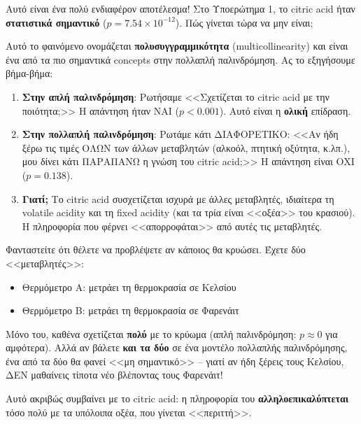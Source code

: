 \documentclass[12pt,a4paper]{article}
\begin{document}
Αυτό είναι ένα πολύ ενδιαφέρον αποτέλεσμα! Στο Υποερώτημα 1, το citric acid ήταν \textbf{στατιστικά σημαντικό} ($p = 7.54 \times 10^{-12}$). Πώς γίνεται τώρα να μην είναι;

\begin{theorybox}
Αυτό το φαινόμενο ονομάζεται \textbf{πολυσυγγραμμικότητα} (multicollinearity) και είναι ένα από τα πιο σημαντικά concepts στην πολλαπλή παλινδρόμηση. Ας το εξηγήσουμε βήμα-βήμα:

\begin{enumerate}
    \item \textbf{Στην απλή παλινδρόμηση}: Ρωτήσαμε <<Σχετίζεται το citric acid με την ποιότητα;>> Η απάντηση ήταν ΝΑΙ ($p < 0.001$). Αυτό είναι η \textbf{ολική} επίδραση.

    \item \textbf{Στην πολλαπλή παλινδρόμηση}: Ρωτάμε κάτι ΔΙΑΦΟΡΕΤΙΚΟ: <<Αν ήδη ξέρω τις τιμές ΟΛΩΝ των άλλων μεταβλητών (αλκοόλ, πτητική οξύτητα, κ.λπ.), μου δίνει κάτι ΠΑΡΑΠΑΝΩ η γνώση του citric acid;>> Η απάντηση είναι ΟΧΙ ($p = 0.138$).

    \item \textbf{Γιατί;} Το citric acid συσχετίζεται ισχυρά με άλλες μεταβλητές, ιδιαίτερα τη volatile acidity και τη fixed acidity (και τα τρία είναι <<οξέα>> του κρασιού). Η πληροφορία που φέρνει <<απορροφάται>> από αυτές τις μεταβλητές.
\end{enumerate}
\end{theorybox}

\begin{examplebox}
Φανταστείτε ότι θέλετε να προβλέψετε αν κάποιος θα κρυώσει. Έχετε δύο <<μεταβλητές>>:
\begin{itemize}
    \item Θερμόμετρο Α: μετράει τη θερμοκρασία σε Κελσίου
    \item Θερμόμετρο Β: μετράει τη θερμοκρασία σε Φαρενάιτ
\end{itemize}

Μόνο του, καθένα σχετίζεται \textbf{πολύ} με το κρύωμα (απλή παλινδρόμηση: $p \approx 0$ για αμφότερα). Αλλά αν βάλετε \textbf{και τα δύο} σε ένα μοντέλο πολλαπλής παλινδρόμησης, ένα από τα δύο θα φανεί <<μη σημαντικό>> -- γιατί αν ήδη ξέρεις τους Κελσίου, ΔΕΝ μαθαίνεις τίποτα νέο βλέποντας τους Φαρενάιτ!

Αυτό ακριβώς συμβαίνει με το citric acid: η πληροφορία του \textbf{αλληλοεπικαλύπτεται} τόσο πολύ με τα υπόλοιπα οξέα, που γίνεται <<περιττή>>.
\end{examplebox}
\end{document}
